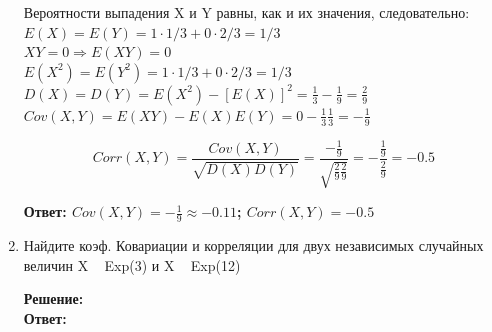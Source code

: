 \documentclass[a4paper,12pt]{article}
\begin{document}
\begin{enumerate}
Вероятности выпадения X и Y равны, как и их значения, следовательно:
$E(X)=E(Y)=1\cdot1/3+0\cdot2/3=1/3$\\
$XY=0 \Rightarrow E(XY)=0$\\
$E(X^2)=E(Y^2)=1\cdot1/3+0\cdot2/3=1/3$\\
$D(X)=D(Y)=E(X^2)-[E(X)]^2=\frac{1}{3}-\frac{1}{9}=\frac{2}{9}$\\
$Cov(X,Y)=E(XY)-E(X)E(Y)=0-\frac{1}{3}\frac{1}{3}=-\frac{1}{9}$

$$Corr(X,Y) = \frac{Cov(X,Y)}{\sqrt{D(X)D(Y)}}=\frac{-\frac{1}{9}}{\sqrt{\frac{2}{9}\frac{2}{9}}}=-\frac{\frac{1}{9}}{\frac{2}{9}}=-0.5$$

\textbf{Ответ: $Cov(X,Y)=-\frac{1}{9}\approx-0.11$; $Corr(X,Y)=-0.5$} 

\item	Найдите коэф. Ковариации и корреляции для двух независимых случайных величин X ~ Exp(3) и X ~ Exp(12)

\textbf{Решение:}\\
\textbf{Ответ: } 

\end{enumerate}
\end{document}
